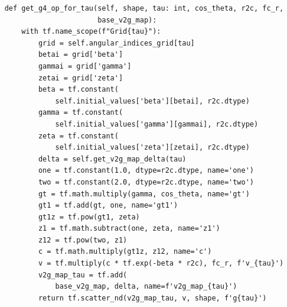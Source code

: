 \documentclass[preprint]{revtex4-2}
\begin{document}
\begin{verbatim}
    def get_g4_op_for_tau(self, shape, tau: int, cos_theta, r2c, fc_r,
                          base_v2g_map):
        with tf.name_scope(f"Grid{tau}"):
            grid = self.angular_indices_grid[tau]
            betai = grid['beta']
            gammai = grid['gamma']
            zetai = grid['zeta']
            beta = tf.constant(
                self.initial_values['beta'][betai], r2c.dtype)
            gamma = tf.constant(
                self.initial_values['gamma'][gammai], r2c.dtype)
            zeta = tf.constant(
                self.initial_values['zeta'][zetai], r2c.dtype)
            delta = self.get_v2g_map_delta(tau)
            one = tf.constant(1.0, dtype=r2c.dtype, name='one')
            two = tf.constant(2.0, dtype=r2c.dtype, name='two')
            gt = tf.math.multiply(gamma, cos_theta, name='gt')
            gt1 = tf.add(gt, one, name='gt1')
            gt1z = tf.pow(gt1, zeta)
            z1 = tf.math.subtract(one, zeta, name='z1')
            z12 = tf.pow(two, z1)
            c = tf.math.multiply(gt1z, z12, name='c')
            v = tf.multiply(c * tf.exp(-beta * r2c), fc_r, f'v_{tau}')
            v2g_map_tau = tf.add(
                base_v2g_map, delta, name=f'v2g_map_{tau}')
            return tf.scatter_nd(v2g_map_tau, v, shape, f'g{tau}')


\end{verbatim}
\end{document}
